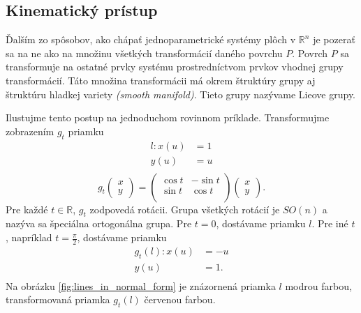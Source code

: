 
\subsection{Kinematický prístup}
Ďalším zo spôsobov, ako chápať jednoparametrické systémy plôch v $\mathbb{R}^n$ je pozerať sa na ne ako na množinu všetkých transformácií daného povrchu $P$. Povrch $P$ sa transformuje na ostatné prvky systému prostredníctvom prvkov vhodnej grupy transformácií. Táto množina transformácii má okrem štruktúry grupy aj štruktúru hladkej variety \textit{(smooth manifold)}. Tieto grupy nazývame Lieove grupy.

\begin{example}
Ilustujme tento postup na jednoduchom rovinnom príklade. Transformujme zobrazením $g_t$ priamku
\begin{align*}
l \colon x(u) &= 1 \\
y(u) &= u \\
\end{align*}
\[
g_t \begin{pmatrix} x \\ y \end{pmatrix} = \begin{pmatrix}
\cos t & -\sin t  \\
\sin t & \cos t  \\
\end{pmatrix}
\begin{pmatrix} x \\ y \end{pmatrix}.
\]
Pre každé $t \in \mathbb{R}$, $g_t$ zodpovedá rotácii. Grupa všetkých rotácií je $SO(n)$ a nazýva sa špeciálna ortogonálna grupa. Pre $t = 0$, dostávame priamku $l$. Pre iné $t$, napríklad $t = \frac{\pi}{2}$, dostávame priamku
\begin{align*}
g_t(l) \colon x(u) &= -u \\
y(u) &= 1. \\
\end{align*}
Na obrázku \ref{fig:lines_in_normal_form} je znázornená priamka $l$ modrou farbou, transformovaná priamka $g_t(l)$ červenou farbou.


\end{example}
